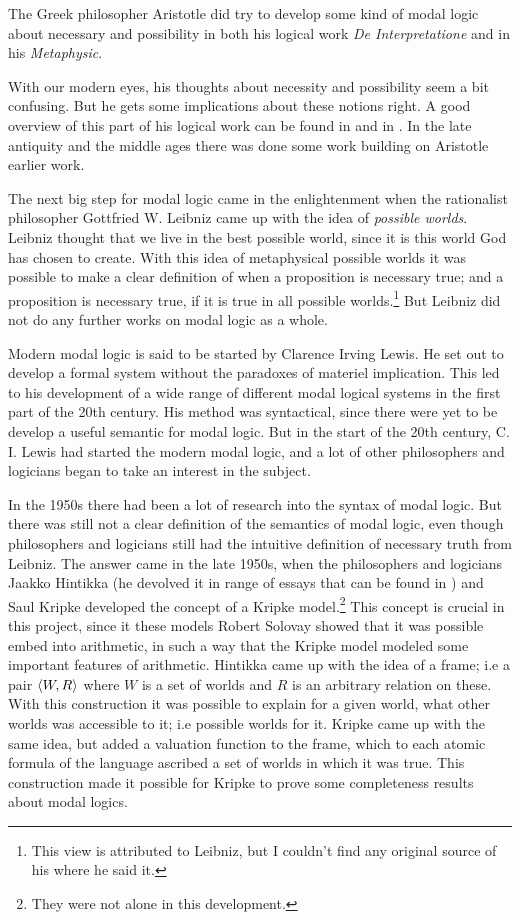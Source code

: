 \documentclass[../main.tex]{subfiles}
\begin{document}
The Greek philosopher Aristotle did try to develop some kind of modal logic
about necessary and possibility in both his logical work \textit{De
Interpretatione} and in his
 \textit{Metaphysic}.

With our modern eyes, his thoughts about necessity  and possibility seem a
bit confusing. But he gets some implications about these notions right. A good
overview of this part of his logical work can be found in \parencite{Lemmon1977} and
in \parencite{Luka1957}.
In the late antiquity and the middle ages there was done some work building on 
Aristotle earlier work. 

The next big step for modal logic came in the enlightenment when the
rationalist philosopher Gottfried W. Leibniz came up with the idea of \textit{possible
worlds}.  Leibniz thought that we live in the best possible world, since it is
this world God has chosen to create\parencite{Leibniz1760}. With this idea of metaphysical possible
worlds it was possible to make a clear definition of when a proposition is
necessary true; and a proposition is necessary true, if it is true in all
possible worlds.\footnote{This view is attributed to Leibniz, but I couldn't
find any original source of his where he said it.}
But Leibniz did not do any further works on modal logic as a
whole.

Modern modal logic is said to be started by Clarence Irving Lewis. He set out
to develop a formal system without the paradoxes of materiel
implication. This led to his development of a wide range of different modal
logical systems in the first part of the 20th century. His method was
syntactical, since there were yet to be develop a useful semantic for modal
logic. But in the start of the 20th century, C. I. Lewis had started the modern
modal logic, and a lot of other philosophers and logicians began to take an
interest in the subject.


In the 1950s there had been a lot of research into the syntax of modal logic.
But there was still not a clear definition of the semantics of modal logic,
even though philosophers and logicians still had the intuitive definition of
necessary truth from Leibniz. The answer came in the late 1950s, when the
philosophers and logicians Jaakko Hintikka (he devolved it in range of essays
that can be found in \cite{Hintikka1969})
and Saul Kripke\parencite{Kripke1963} developed the concept of a Kripke model.\footnote{They were not
	alone in this development.} This concept is crucial in this project,
since it these models Robert Solovay showed that it was possible embed into
arithmetic, in such a way that the Kripke model modeled some important features
of arithmetic.
Hintikka came up with the idea of a frame; i.e a pair $\langle W,R\rangle$ where $W$ is
a set of worlds and $R$ is an arbitrary relation on these. With this
construction it was possible to explain for a given world, what other worlds
was accessible to it; i.e possible worlds for it. Kripke came up with the same
idea, but added a valuation function to the frame, which to each atomic formula of the
language ascribed a set of worlds in which it was true.  This construction made
it possible for Kripke to prove some completeness results about modal logics.
\end{document}
